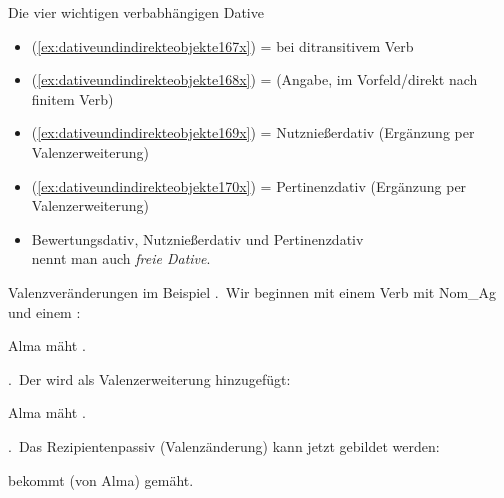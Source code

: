 \begin{frame}
  {Die vier wichtigen verbabhängigen Dative}
  \pause
  \begin{exe}
    \ex\label{ex:dativeundindirekteobjekte166x}
    \begin{xlist}
      \pause
      \pause
      \pause
    \end{xlist}
  \end{exe}
  \Halbzeile
  \pause
  \begin{itemize}[<+->]
    \item (\ref{ex:dativeundindirekteobjekte167x}) =  bei ditransitivem Verb
    \item (\ref{ex:dativeundindirekteobjekte168x}) =  (Angabe, im Vorfeld\slash direkt nach finitem Verb)
    \item (\ref{ex:dativeundindirekteobjekte169x}) = \alert{Nutznießerdativ} (\alert{Ergänzung per Valenzerweiterung})
    \item (\ref{ex:dativeundindirekteobjekte170x}) = \alert{Pertinenzdativ} (\alert{Ergänzung per Valenzerweiterung})
      \Halbzeile
    \item Bewertungsdativ, Nutznießerdativ und Pertinenzdativ\\
      nennt man auch \textit{freie Dative}.
  \end{itemize}
\end{frame}

\begin{frame}
  {Valenzveränderungen im Beispiel}
  .~Wir beginnen mit einem Verb mit \alert{Nom\_Ag} und einem :\\
  \pause
  \Halbzeile
  \begin{exe}
    \ex \alert{Alma} mäht .
  \end{exe}
  \Zeile
  .~Der  wird als Valenzerweiterung hinzugefügt:\\
  \pause
  \Halbzeile
  \begin{exe}
    \ex \alert{Alma} mäht  .
  \end{exe}
  \Zeile
  .~Das Rezipientenpassiv (Valenzänderung) kann jetzt gebildet werden:
  \pause
  \Halbzeile
  \begin{exe}
    \ex {} bekommt \alert{(von Alma)}  gemäht.
  \end{exe}
\end{frame}

